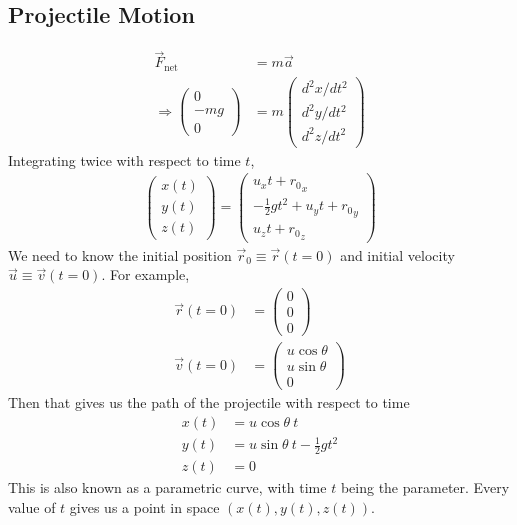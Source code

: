 \documentclass{article}
\begin{document}
\subsection{Projectile Motion}
\begin{align}
\vec{F}_{\text{net}} &= m \vec{a} \\
\Rightarrow \left(
    \begin{array}{c}  
         0 \\
         -mg \\
         0
    \end{array} 
    \right) &= m \left(
    \begin{array}{c}  
         d^2x/dt^2 \\
         d^2y/dt^2 \\
         d^2z/dt^2
    \end{array} 
    \right)
\end{align}
Integrating twice with respect to time $t$,
\begin{align}
    \left(
    \begin{array}{c}  
         x(t) \\
         y(t) \\
         z(t)
    \end{array} 
    \right) = \left(
    \begin{array}{c}  
          {u}_x t + {r_0}_x\\
         -\frac{1}{2}gt^2 + {u}_y t + {r_0}_y\\
          {u}_z t + {r_0}_z
    \end{array} 
    \right)
\end{align}
We need to know the initial position $\vec{r}_0 \equiv \vec{r}(t=0)$ and initial velocity $\vec{u} \equiv \vec{v}(t=0)$. For example, 
\begin{align}
    \vec{r}(t=0) &= \left(
    \begin{array}{c}  
         0 \\
         0 \\
         0
    \end{array} 
    \right) \\
    \vec{v}(t=0) &= \left(
    \begin{array}{c}  
         u \cos \theta \\
         u \sin \theta \\
         0
    \end{array} 
    \right)
\end{align}   
Then that gives us the path of the projectile with respect to time
\begin{align}
    x(t) &= u \cos \theta\ t \label{eq:xt} \\
    y(t) &= u \sin \theta\ t - \frac{1}{2} gt^2 \\
    z(t) &= 0
\end{align}
This is also known as a parametric curve, with time $t$ being the parameter. Every value of $t$ gives us a point in space $(x(t),y(t),z(t))$. 
\end{document}
